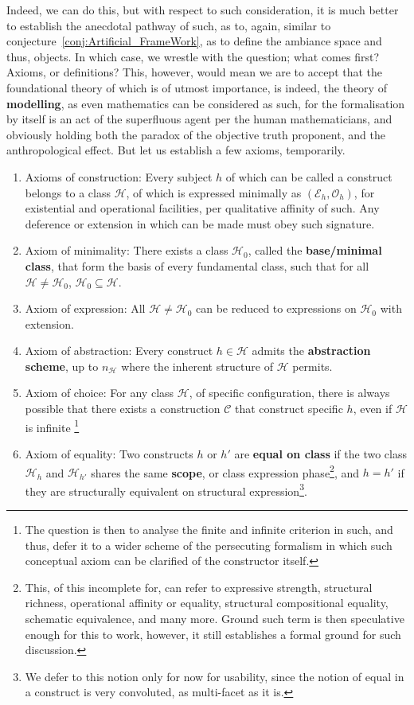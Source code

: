 \begin{note}
    Indeed, we can do this, but with respect to such consideration, it is much better to establish the anecdotal pathway of such, as to, again, similar to conjecture~\ref{conj:Artificial_FrameWork}, as to define the ambiance space and thus, objects. In which case, we wrestle with the question; what comes first? Axioms, or definitions? This, however, would mean we are to accept that the foundational theory of which is of utmost importance, is indeed, the theory of \textbf{modelling}, as even mathematics can be considered as such, for the formalisation by itself is an act of the superfluous agent per the human mathematicians, and obviously holding both the paradox of the objective truth proponent, and the anthropological effect. But let us establish a few axioms, temporarily. 
    \begin{enumerate}[topsep=1pt,itemsep=1pt]
        \item Axioms of construction: Every subject $h$ of which can be called a construct belongs to a class $\mathcal{H}$, of which is expressed minimally as $(\mathcal{E}_{h},\mathcal{O}_{h})$, for existential and operational facilities, per qualitative affinity of such. Any deference or extension in which can be made must obey such signature. 
        \item Axiom of minimality: There exists a class $\mathcal{H}_{0}$, called the \textbf{base/minimal class}, that form the basis of every fundamental class, such that for all $\mathcal{H}\neq \mathcal{H}_{0}$, $\mathcal{H}_{0}\subseteq \mathcal{H}$. 
        \item Axiom of expression: All $\mathcal{H}\neq \mathcal{H}_{0}$ can be reduced to expressions on $\mathcal{H}_{0}$ with extension. 
        \item Axiom of abstraction: Every construct $h\in \mathcal{H}$ admits the \textbf{abstraction scheme}, up to $n_{\mathcal{H}}$ where the inherent structure of $\mathcal{H}$ permits. 
        \item Axiom of choice: For any class $\mathcal{H}$, of specific configuration, there is always possible that there exists a construction $\mathcal{C}$ that construct specific $h$, even if $\mathcal{H}$ is infinite \footnote{The question is then to analyse the finite and infinite criterion in such, and thus, defer it to a wider scheme of the persecuting formalism in which such conceptual axiom can be clarified of the constructor itself.} 
        \item Axiom of equality: Two constructs $h$ or $h'$ are \textbf{equal on class} if the two class $\mathcal{H}_{h}$ and $\mathcal{H}_{h'}$ shares the same \textbf{scope}, or class expression phase\footnote{This, of this incomplete for, can refer to expressive strength, structural richness, operational affinity or equality, structural compositional equality, schematic equivalence, and many more. Ground such term is then speculative enough for this to work, however, it still establishes a formal ground for such discussion.}, and $h=h'$ if they are structurally equivalent on structural expression\footnote{We defer to this notion only for now for usability, since the notion of equal in a construct is very convoluted, as multi-facet as it is.}. 

\end{enumerate}
\end{note}
